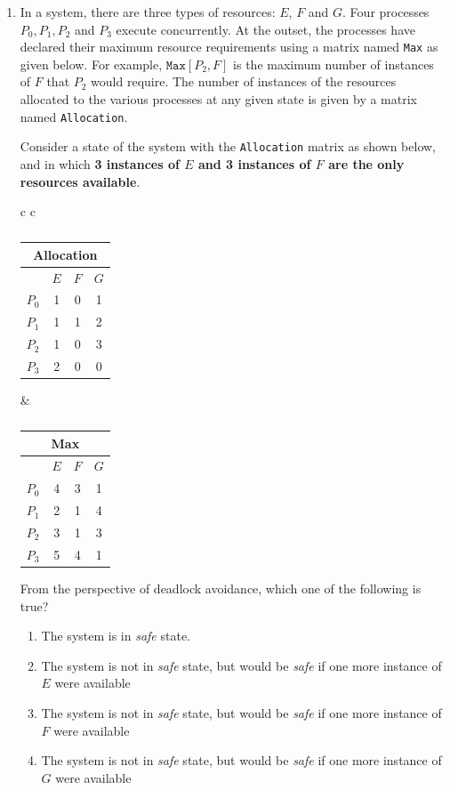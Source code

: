 \documentclass[12pt]{article}
\begin{document}
\begin{enumerate}
\item In a system, there are three types of resources: $E$, $F$ and $G$. Four processes $P_{0}, P_{1}, P_{2}$ and $P_{3}$
execute concurrently. At the outset, the processes have declared their maximum resource
requirements using a matrix named \texttt{Max} as given below. For example, $\texttt{Max}[P_2,F]$ is the
maximum number of instances of $F$ that $P_2$ would require. The number of instances of the
resources allocated to the various processes at any given state is given by a matrix named
\texttt{Allocation}.

Consider a state of the system with the \texttt{Allocation} matrix as shown below, and in which
\textbf{3 instances of $E$ and 3 instances of $F$ are the only resources available}.

\begin{table}[H]
\centering
\caption{} \label{}
\begin{tabular}{c c}
\begin{tabular}{|c|ccc|}
\multicolumn{4}{c}{\textbf{Allocation}}\\
\hline
     & $E$ & $F$ & $G$\\ \hline
$P_0$& 1 & 0 & 1\\
$P_1$& 1 & 1 & 2\\
$P_2$& 1 & 0 & 3\\
$P_3$& 2 & 0 & 0\\
\hline
\end{tabular}
&
\begin{tabular}{|c|ccc|}
\multicolumn{4}{c}{\textbf{Max}}\\
\hline
     & $E$ & $F$ & $G$\\ \hline
$P_0$& 4 & 3 & 1\\
$P_1$& 2 & 1 & 4\\
$P_2$& 3 & 1 & 3\\
$P_3$& 5 & 4 & 1\\
\hline
\end{tabular}
\end{tabular}
\end{table}

From the perspective of deadlock avoidance, which one of the following is true?

\begin{enumerate}
\item The system is in \textit{safe} state.
\item The system is not in \textit{safe} state, but would be \textit{safe} if one more instance of $E$ were available
\item The system is not in \textit{safe} state, but would be \textit{safe} if one more instance of $F$ were available
\item The system is not in \textit{safe} state, but would be \textit{safe} if one more instance of $G$ were available
\end{enumerate}


\end{enumerate}
\end{document}
